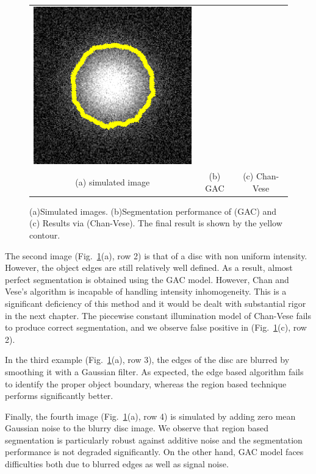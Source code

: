 \begin{figure}[tb]
\begin{tabular}{@{}ccc@{}}
\includegraphics[height=0.3\textwidth]{images/demo/GACvsCV/CV_gauss_noisy}	\\
(a) simulated image & (b) GAC\cite{caselles_GAC} & (c) Chan-Vese\cite{chan_vese}
\end{tabular}
\caption[Edge based model vs region based model]{(a)Simulated images. (b)Segmentation performance of (GAC\cite{caselles_GAC}) and (c) Results via (Chan-Vese\cite{chan_vese}). The final result is shown by the yellow contour.}
\label{fig:GACvsCV}
\end{figure}

The second image (Fig.~\ref{fig:GACvsCV}(a), row 2) is that of a disc with non uniform intensity. However, the object edges are still relatively well defined. As a result, almost perfect segmentation is obtained using the GAC model. However, Chan and Vese's algorithm is incapable of handling intensity inhomogeneity. This is a significant deficiency of this method and it would be dealt with substantial rigor in the next chapter. The piecewise constant illumination model of Chan-Vese fails to produce correct segmentation, and we observe false positive in (Fig.~\ref{fig:GACvsCV}(c), row 2).

In the third example (Fig.~\ref{fig:GACvsCV}(a), row 3), the edges of the disc are blurred by smoothing it with a Gaussian filter. As expected, the edge based algorithm fails to identify the proper object boundary, whereas the region based technique performs significantly better.

Finally, the fourth image (Fig.~\ref{fig:GACvsCV}(a), row 4) is simulated by adding zero mean Gaussian noise to the blurry disc image. We observe that region based segmentation is particularly robust against additive noise and the segmentation performance is not degraded significantly. On the other hand, GAC model faces difficulties both due to blurred edges as well as signal noise.

